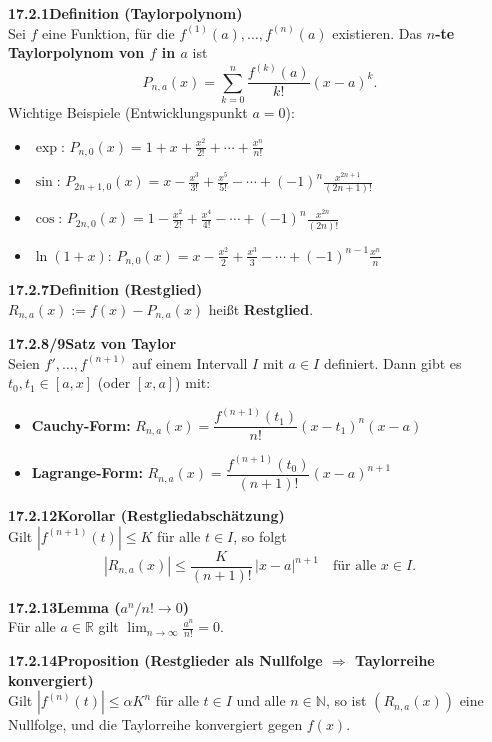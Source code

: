 \documentclass[a4paper,12pt]{article}
\newcommand{\gentry}[3]{%
  \noindent\textbf{#1\quad #2}\nopagebreak\\[0.2em]
  #3\par\smallskip
}
\begin{document}
\gentry{17.2.1}{Definition (Taylorpolynom)}{%
  Sei $f$ eine Funktion, für die $f^{(1)}(a),\ldots,f^{(n)}(a)$ existieren.
  Das \textbf{$n$-te Taylorpolynom von $f$ in $a$} ist
  \[
    P_{n,a}(x) = \sum_{k=0}^{n} \frac{f^{(k)}(a)}{k!}(x-a)^k.
  \]
  Wichtige Beispiele (Entwicklungspunkt $a=0$):
  \begin{itemize}[topsep=2pt,itemsep=1pt]
    \item $\exp$: $P_{n,0}(x) = 1 + x + \frac{x^2}{2!} + \cdots + \frac{x^n}{n!}$
    \item $\sin$: $P_{2n+1,0}(x) = x - \frac{x^3}{3!} + \frac{x^5}{5!} - \cdots + (-1)^n\frac{x^{2n+1}}{(2n+1)!}$
    \item $\cos$: $P_{2n,0}(x) = 1 - \frac{x^2}{2!} + \frac{x^4}{4!} - \cdots + (-1)^n\frac{x^{2n}}{(2n)!}$
    \item $\ln(1+x)$: $P_{n,0}(x) = x - \frac{x^2}{2} + \frac{x^3}{3} - \cdots + (-1)^{n-1}\frac{x^n}{n}$
  \end{itemize}
}

\gentry{17.2.7}{Definition (Restglied)}{%
  $R_{n,a}(x) := f(x) - P_{n,a}(x)$ heißt \textbf{Restglied}.
}

\gentry{17.2.8/9}{Satz von Taylor}{%
  Seien $f',\ldots,f^{(n+1)}$ auf einem Intervall $I$ mit $a \in I$ definiert.
  Dann gibt es $t_0, t_1 \in [a,x]$ (oder $[x,a]$) mit:
  \begin{itemize}[topsep=2pt,itemsep=1pt]
    \item \textbf{Cauchy-Form:} $R_{n,a}(x) = \dfrac{f^{(n+1)}(t_1)}{n!}(x-t_1)^n(x-a)$
    \item \textbf{Lagrange-Form:} $R_{n,a}(x) = \dfrac{f^{(n+1)}(t_0)}{(n+1)!}(x-a)^{n+1}$
  \end{itemize}
}

\gentry{17.2.12}{Korollar (Restgliedabschätzung)}{%
  Gilt $|f^{(n+1)}(t)| \le K$ für alle $t \in I$, so folgt
  \[
    |R_{n,a}(x)| \le \frac{K}{(n+1)!}\,|x-a|^{n+1} \quad\text{für alle } x \in I.
  \]
}

\gentry{17.2.13}{Lemma ($a^n/n! \to 0$)}{%
  Für alle $a \in \mathbb{R}$ gilt $\displaystyle\lim_{n\to\infty} \frac{a^n}{n!} = 0$.
}

\gentry{17.2.14}{Proposition (Restglieder als Nullfolge $\Rightarrow$ Taylorreihe konvergiert)}{%
  Gilt $|f^{(n)}(t)| \le \alpha K^n$ für alle $t \in I$ und alle $n \in \mathbb{N}$,
  so ist $(R_{n,a}(x))$ eine Nullfolge, und die Taylorreihe konvergiert gegen $f(x)$.
}

\end{document}
